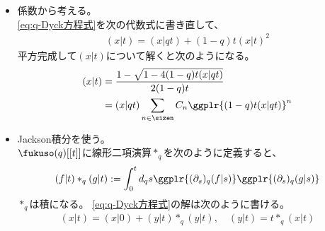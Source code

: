 {\begin{itemize}
\begin{equation*}
\begin{split}
{				& *++[o][F=]{y_t} \ar@<1ex>[l]^{\eta^\flat t}
			}
		\end{split}\end{equation*}
		$x_{qt}$にも同様の遷移図を考えて、
		次のように遷移図を連結する。
		\begin{equation*}\begin{split}
			\xymatrix{
				x_t \ar[d]^{\xi} \ar@(dl,ul)^{(1-q)\eta} 
				& *++[o][F=]{y_t} \ar[l]_{\eta\flat t} \\
				x_{qt} \ar@<1ex>[r]^{(x|q^2t)} \ar@(dl,ul)^{(1-q)\eta} 
				& *++[o][F=]{y_{qt}} \ar@<1ex>[l]^{\eta^\flat t} 
					\ar[u]_{\xi_\flat}
			}
		\end{split}\end{equation*}
		さて、ここから。
		\item 係数から考える。\\
		\eqref{eq:q-Dyck方程式}を次の代数式に書き直して、
		\begin{equation*}\begin{split}
			(x|t) = (x|qt) + (1 - q)t(x|t)^2 
		\end{split}\end{equation*}
		平方完成して$(x|t)$について解くと次のようになる。
		\begin{equation*}\begin{split}
			(x|t) &= \frac{1 - \sqrt{1 - 4(1 - q)t(x|qt)}}{2(1 - q)t} \\
				&= (x|qt) \sum_{n\in\sizen} C_n\ggplr{(1 - q)t(x|qt)}^n
		\end{split}\end{equation*}
		\item Jackson積分を使う。\\
		$\fukuso(q)[[t]]$に線形二項演算$*_q$を次のように定義すると、
		\begin{equation*}\begin{split}
			(f|t)*_q(g|t) := \int_0^td_qs \ggplr{(\partial_s)_q(f|s)}
				\ggplr{(\partial_s)_q(g|s)}
		\end{split}\end{equation*}
		$*_q$は積になる。
		\eqref{eq:q-Dyck方程式}の解は次のように書ける。
		\begin{equation*}\begin{split}
			(x|t) = (x|0) + (y|t)*_q(y|t) 
			,\quad (y|t) = t*_q(x|t)
		\end{split}\end{equation*}
	\end{itemize} %
}
